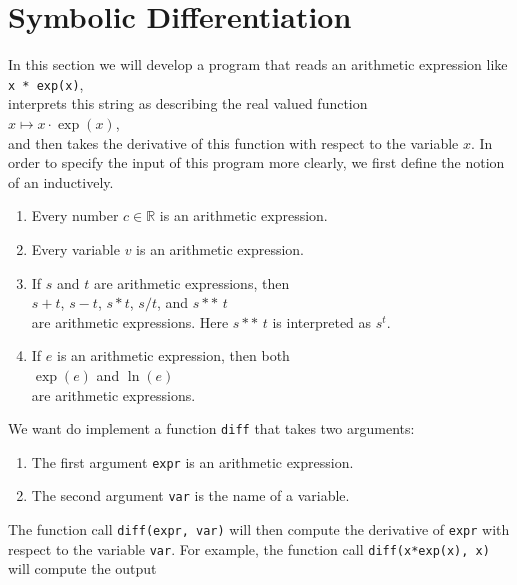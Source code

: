 \section{Symbolic Differentiation}
In this section we will develop a program that reads an arithmetic expression like 
\\[0.2cm]
\hspace*{1.3cm}
\texttt{x * exp(x)},
\\[0.2cm]
interprets this string as describing the real valued function 
\\[0.2cm]
\hspace*{1.3cm}
$x \mapsto x \cdot \exp(x)$, 
\\[0.2cm]
and then takes the derivative of this function with respect to the variable $x$.  In order to specify the input
of this program more clearly, we first define the notion of an  inductively.
\begin{enumerate}
\item Every number $c \in \mathbb{R}$ is an arithmetic expression.
\item Every variable $v$ is an arithmetic expression.
\item If $s$ and $t$ are arithmetic expressions, then
      \\[0.2cm]
      \hspace*{1.3cm}
      $s + t$, \quad $s - t$, \quad $s * t$, \quad $s / t$, \quad and \quad $s \,\mathtt{**}\, t$
      \\[0.2cm]
      are arithmetic expressions.  Here $s \,\mathtt{**}\, t$ is interpreted as $s^t$.
      
\item If $e$ is an arithmetic expression, then both
      \\[0.2cm]
      \hspace*{1.3cm}
      $\exp(e)$ \quad and \quad $\ln(e)$
      \\[0.2cm]
      are arithmetic expressions.
\end{enumerate}
We want do implement a function \texttt{diff} that takes two arguments:
\begin{enumerate}
\item The first argument \texttt{expr} is an arithmetic expression.
\item The second argument \texttt{var} is the name of a variable.
\end{enumerate}
The function call \texttt{diff(expr, var)} will then compute the derivative of \texttt{expr} with respect to the variable \texttt{var}.  For example, the function call \texttt{diff(x*exp(x), x)} will compute the output
